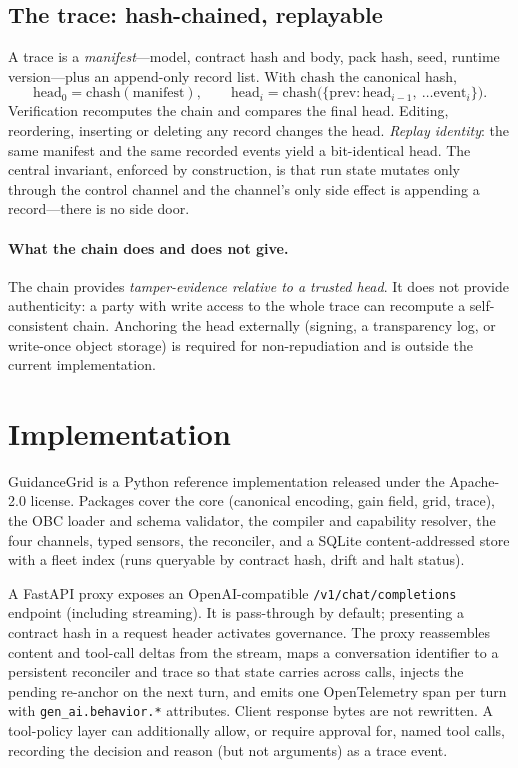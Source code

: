 \documentclass[11pt]{article}
\newcommand{\rt}{GuidanceGrid}
\newcommand{\obc}{OBC}
\newcommand{\code}[1]{\texttt{#1}}
\begin{document}
\subsection{The trace: hash-chained, replayable}
\label{sec:trace}

A trace is a \emph{manifest}---model, contract hash and body, pack hash, seed,
runtime version---plus an append-only record list. With $\mathrm{chash}$ the
canonical hash,
\[
 \text{head}_0=\mathrm{chash}(\text{manifest}),\qquad
 \text{head}_i=\mathrm{chash}\big(\{\text{prev}:\text{head}_{i-1},\ \dots\text{event}_i\}\big).
\]
Verification recomputes the chain and compares the final head. Editing,
reordering, inserting or deleting any record changes the head. \emph{Replay
identity}: the same manifest and the same recorded events yield a bit-identical
head. The central invariant, enforced by construction, is that run state mutates
only through the control channel and the channel's only side effect is appending a
record---there is no side door.

\paragraph{What the chain does and does not give.}
The chain provides \emph{tamper-evidence relative to a trusted head}. It does not
provide authenticity: a party with write access to the whole trace can recompute a
self-consistent chain. Anchoring the head externally (signing, a transparency log,
or write-once object storage) is required for non-repudiation and is outside the
current implementation.

\section{Implementation}
\label{sec:impl}

\rt{} is a Python reference implementation released under the Apache-2.0 license. Packages cover the
core (canonical encoding, gain field, grid, trace), the \obc{} loader and schema
validator, the compiler and capability resolver, the four channels, typed
sensors, the reconciler, and a SQLite content-addressed store with a fleet index
(runs queryable by contract hash, drift and halt status).

A FastAPI proxy exposes an OpenAI-compatible \code{/v1/chat/completions}
endpoint (including streaming). It is pass-through by default; presenting a
contract hash in a request header activates governance. The proxy reassembles
content and tool-call deltas from the stream, maps a conversation identifier to a
persistent reconciler and trace so that state carries across calls, injects the
pending re-anchor on the next turn, and emits one OpenTelemetry span per turn with
\code{gen\_ai.behavior.*} attributes. Client response bytes are not rewritten. A
tool-policy layer can additionally allow, or require approval for, named tool
calls, recording the decision and reason (but not arguments) as a trace event.
\end{document}
